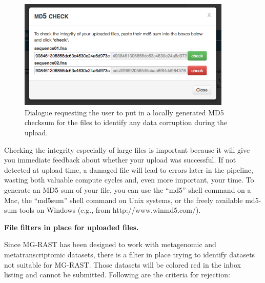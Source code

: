 \documentclass[12pt,fullpage]{report}
\begin{document}
\begin{figure}[ht]
\begin{center}
\includegraphics[width=4in]{Images/upload-page-md5-verification.png}
\end{center}
\caption{
Dialogue requesting the user to put in a locally generated \gls{MD5} checksum for the files to identify any data corruption during the upload.
}
\label{fig:upload-page-md5-verification}
\end{figure}

Checking the integrity especially of large files is important because it will give you immediate feedback about whether your upload was successful. If not detected at upload time, a damaged file will lead to errors later in the pipeline, wasting both valuable compute cycles and, even more important, your time. To generate an \gls{MD5} sum of your file, you can use the ``md5'' shell command on a Mac, the ``md5sum'' shell command on Unix systems, or the freely available md5-sum tools on Windows (e.g., from http://www.winmd5.com/).

\noindent
{\bf File filters in place for uploaded files.}

Since MG-RAST has been designed to work with metagenomic and metatranscriptomic datasets, there is a filter in place trying to identify
datasets not suitable for MG-RAST. Those datasets will be colored red in the inbox listing and cannot be submitted.
Following are the criteria for rejection:
\end{document}
